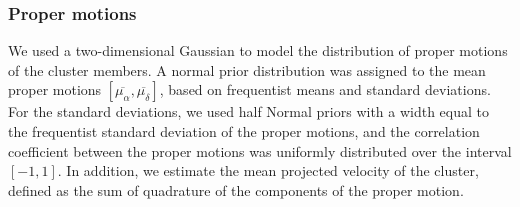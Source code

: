 \documentclass{aa}
\begin{document}
\subsubsection{Proper motions}
We used a two-dimensional Gaussian to model the distribution of proper motions of the cluster members. A normal prior distribution was assigned to the mean proper motions $\left[\overline{\mu_\alpha},\overline{\mu_\delta}\right]$, based on frequentist means and standard deviations. For the standard deviations, we used half Normal priors with a width equal to the frequentist standard deviation of the proper motions, and the correlation coefficient between the proper motions was uniformly distributed over the interval $[-1, 1]$. In addition, we estimate the mean projected velocity of the cluster, defined as the sum of quadrature of the components of the proper motion.
\end{document}
